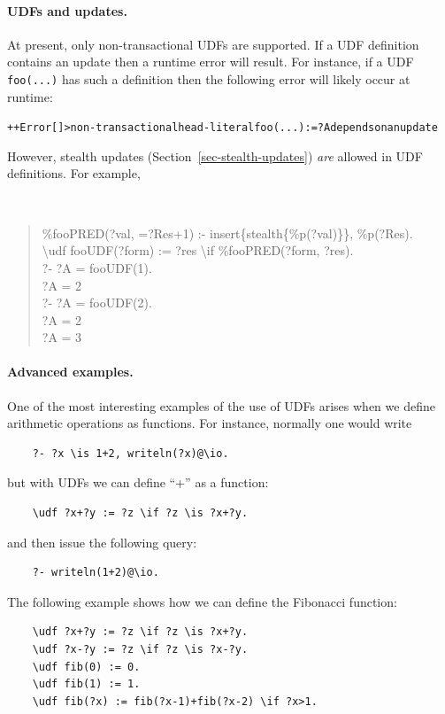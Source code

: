 \documentclass[11pt]{article}
\newcommand{\ERGO}{\mbox{\smaller{\ensuremath{\cal{E}}\smaller{{\sc{RGO}}}}}\xspace}
\newcommand{\FLSYSTEM}{\ERGO}
\newcommand{\bs}{\textbackslash}
\begin{document}
\paragraph{UDFs and updates.}
At present, only non-transactional UDFs are supported. If a UDF definition
contains an update then a runtime error will result. For instance, if a UDF
\texttt{foo(...)} has such a definition then the following error will
likely occur at runtime: 
\begin{alltt}
++Error[\FLSYSTEM{}]> non-transactional head-literal foo(...) := ?A depends on an update
\end{alltt}
However,
stealth updates (Section~\ref{sec-stealth-updates})
\emph{are} allowed in UDF definitions. For example,
{\tt
\begin{quote}
    \%fooPRED(?val, =?Res+1) :- insert\{stealth\{\%p(?val)\}\}, \%p(?Res).
    \\
    \bs{}udf fooUDF(?form) := ?res \bs{}if \%fooPRED(?form, ?res).
    \vspace{2mm}\\
    ?- ?A = fooUDF(1).
    \vspace*{3mm}\\
    ?A = 2
    \vspace{2mm}\\
    ?- ?A = fooUDF(2).
    \vspace*{3mm}\\
    ?A = 2
    \\
    ?A = 3
\end{quote}
  }


\paragraph{Advanced examples.}
One of the most interesting examples of the use of UDFs arises when we
define arithmetic operations as functions. For instance, normally one would
write
\begin{verbatim}
    ?- ?x \is 1+2, writeln(?x)@\io.
\end{verbatim}
but with UDFs we can define ``+'' as a function:
\begin{verbatim}
    \udf ?x+?y := ?z \if ?z \is ?x+?y.
\end{verbatim}
and then issue the following query:
\begin{verbatim}
    ?- writeln(1+2)@\io.
\end{verbatim}
The following example shows how we can define the Fibonacci function:
\begin{verbatim}
    \udf ?x+?y := ?z \if ?z \is ?x+?y.
    \udf ?x-?y := ?z \if ?z \is ?x-?y.
    \udf fib(0) := 0.
    \udf fib(1) := 1.
    \udf fib(?x) := fib(?x-1)+fib(?x-2) \if ?x>1.
\end{verbatim}
\end{document}
